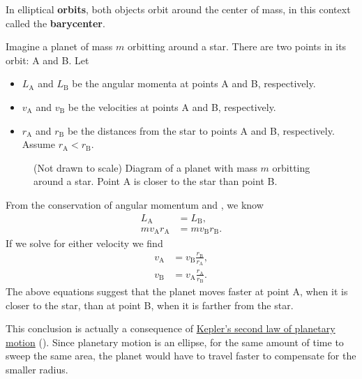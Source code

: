 In elliptical \textbf{orbits}, both objects orbit around the center of mass,
in this context called the \textbf{barycenter}.

Imagine a planet of mass \(m\) orbitting around a star.
There are two points in its orbit: A and B.
Let
\begin{itemize}
    \item \(L_\mathrm{A}\) and \(L_\mathrm{B}\) be the angular
        momenta at points A and B, respectively.
    \item \(v_\mathrm{A}\) and \(v_\mathrm{B}\) be the velocities at
        points A and B, respectively.
    \item \(r_\mathrm{A}\) and \(r_\mathrm{B}\) be the distances from
        the star to points A and B, respectively.
        Assume \(r_\mathrm{A} < r_\mathrm{B}\).
\end{itemize}
\begin{figure}[ht]
    \centering
    
    \caption{
        (Not drawn to scale)
        Diagram of a planet with mass \(m\) orbitting around a star.
        Point A is closer to the star than point B.
    }
\end{figure}

From the conservation of angular momentum
and ,
we know
\begin{align}
    L_\mathrm{A} &= L_\mathrm{B}, \\
    m v_\mathrm{A} r_\mathrm{A} &= m v_\mathrm{B} r_\mathrm{B}.
\end{align}
If we solve for either velocity we find
\begin{equation}
    \begin{aligned}
        v_\mathrm{A} &= v_\mathrm{B} \frac{r_\mathrm{B}}{r_\mathrm{A}}, \\
        v_\mathrm{B} &= v_\mathrm{A} \frac{r_\mathrm{A}}{r_\mathrm{B}}.
    \end{aligned}
\end{equation}
The above equations suggest that the planet moves faster at point A,
when it is closer to the star, than at point B,
when it is farther from the star.

This conclusion is actually a consequence of
\hyperref[itm:keplers-2nd-law]{Kepler's second law of planetary
motion} ().
Since planetary motion is an ellipse,
for the same amount of time to sweep the same area,
the planet would have to travel faster to compensate for the smaller radius.

